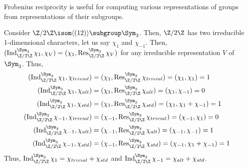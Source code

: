 \documentclass[11pt,leqno,oneside]{amsbook}
\newcommand{\Res}{\operatorname{Res}}
\newcommand{\Ind}{\operatorname{Ind}}
\numberwithin{thm}{section}
\begin{document}
Frobenius reciprocity is useful for computing various representations
of groups from representations of their subgroups.
\begin{example}
  Consider \(\Z/2\Z \isom \langle (12) \rangle \subgroup
  \Sym_3\). Then, \(\Z/2\Z\) has two irreducible 1-dimensional
  characters, let us say \(\chi_1\) and \(\chi_{-1}\). Then,
  \((\Ind_{\Z/2\Z}^{\Sym_3} \chi_1, \chi_V) = (\chi_1,
  \Res_{\Z/2\Z}^{\Sym_3} \chi_V)\) for any irreducible representation
  \(V\) of \(\Sym_3\). Thus,
  \begin{align*}
    (\Ind_{\Z/2\Z}^{\Sym_3} \chi_1, \chi_{trivial}) & = (\chi_1,
    \Res_{\Z/2\Z}^{\Sym_3} \chi_{trivial}) = (\chi_1, \chi_1) = 1 \\
    (\Ind_{\Z/2\Z}^{\Sym_3} \chi_1, \chi_{alt}) & = (\chi_1,
    \Res_{\Z/2\Z}^{\Sym_3} \chi_{alt}) = (\chi_1, \chi_{-1}) = 0 \\
    (\Ind_{\Z/2\Z}^{\Sym_3} \chi_1, \chi_{std}) & = (\chi_1,
  \Res_{\Z/2\Z}^{\Sym_3} \chi_{std})  = (\chi_1, \chi_1 + \chi_{-1}) =
    1 \\
    (\Ind_{\Z/2\Z}^{\Sym_3} \chi_{-1}, \chi_{trivial}) & = (\chi_{-1},
    \Res_{\Z/2\Z}^{\Sym_3} \chi_{trivial}) = (\chi_{-1}, \chi_1) = 0 \\
    (\Ind_{\Z/2\Z}^{\Sym_3} \chi_{-1}, \chi_{alt}) & = (\chi_{-1},
    \Res_{\Z/2\Z}^{\Sym_3} \chi_{alt}) = (\chi_{-1}, \chi_{-1}) = 1 \\
    (\Ind_{\Z/2\Z}^{\Sym_3} \chi_{-1}, \chi_{std}) & = (\chi_{-1},
  \Res_{\Z/2\Z}^{\Sym_3} \chi_{std}) = (\chi_{-1}, \chi_1 + \chi_{-1}) =
    1
  \end{align*}
  Thus, \(\Ind_{\Z/2\Z}^{\Sym_3} \chi_1 = \chi_{trivial} +
  \chi_{std}\) and \(\Ind_{\Z/2\Z}^{\Sym_3} \chi_{-1} = \chi_{alt} + \chi_{std}\).
\end{example}
\end{document}
